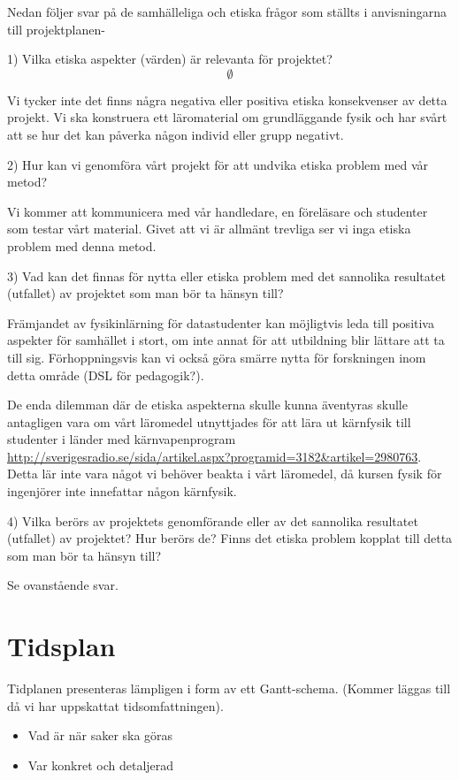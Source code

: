 \documentclass[12pt,a4paper]{scrartcl}
\begin{document}
Nedan följer svar på de samhälleliga och etiska frågor som ställts i anvisningarna till projektplanen-

1) Vilka etiska  aspekter (värden) är relevanta för projektet?
\[
\emptyset
\]

Vi tycker inte det finns några negativa eller positiva etiska konsekvenser av detta projekt. Vi ska konstruera ett läromaterial om grundläggande fysik och har svårt att se hur det kan påverka någon individ eller grupp negativt.

2) Hur kan vi genomföra vårt projekt för att undvika etiska problem med vår metod?

Vi kommer att kommunicera med vår handledare, en föreläsare och studenter som testar vårt material. Givet att vi är allmänt trevliga ser vi inga etiska problem med denna metod.

3) Vad kan det finnas för nytta eller etiska problem med det sannolika resultatet (utfallet) av projektet som man bör ta hänsyn till?

Främjandet av fysikinlärning för datastudenter kan möjligtvis leda till positiva aspekter för samhället i stort, om inte annat för att utbildning blir lättare att ta till sig. Förhoppningsvis kan vi också göra smärre nytta för forskningen inom detta område (DSL för pedagogik?).

De enda dilemman där de etiska aspekterna skulle kunna äventyras skulle antagligen vara om vårt läromedel utnyttjades för att lära ut kärnfysik till studenter i länder med kärnvapenprogram \url{http://sverigesradio.se/sida/artikel.aspx?programid=3182&artikel=2980763}.
   Detta lär inte vara något vi behöver beakta i vårt läromedel, då kursen fysik för ingenjörer inte innefattar någon kärnfysik.

4)  Vilka berörs av projektets genomförande eller av det sannolika resultatet (utfallet) av projektet? Hur berörs de? Finns det etiska problem kopplat till detta som man bör ta hänsyn till?

Se ovanstående svar.

\section{Tidsplan}

Tidplanen presenteras lämpligen i form av ett Gantt-schema.
(Kommer läggas till då vi har uppskattat tidsomfattningen).

\begin{itemize}
    \item Vad är när saker ska göras
    \item Var konkret och detaljerad
\end{itemize}
\end{document}
